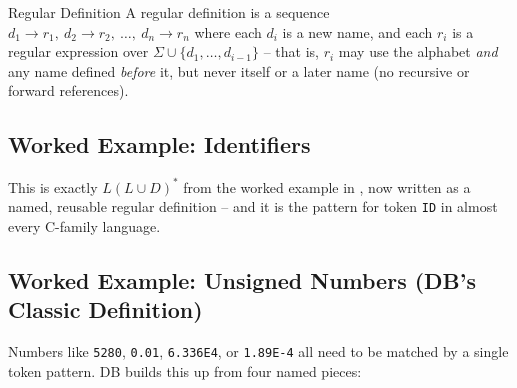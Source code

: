 \documentclass[full-course-notes.tex]{subfiles}
\begin{document}
\begin{defbox}{Regular Definition}
A regular definition is a sequence $d_1 \to r_1,\ d_2 \to r_2,\ \dots,\ d_n \to r_n$ where each
$d_i$ is a new name, and each $r_i$ is a regular expression over $\Sigma \cup \{d_1,\dots,
d_{i-1}\}$ -- that is, $r_i$ may use the alphabet \emph{and} any name defined \emph{before} it,
but never itself or a later name (no recursive or forward references).
\end{defbox}

\subsection{Worked Example: Identifiers}
\label{sec:l4-worked-example-identifiers}

\begin{center}
\end{center}

This is exactly $L(L\cup D)^{*}$ from the worked example in ,
now written as a named, reusable regular definition -- and it is the pattern for token
\texttt{ID} in almost every C-family language.

\subsection{Worked Example: Unsigned Numbers (DB's Classic Definition)}
\label{sec:l4-worked-example-numbers}

Numbers like \texttt{5280}, \texttt{0.01}, \texttt{6.336E4}, or \texttt{1.89E-4} all need to be
matched by a single token pattern. DB builds this up from four named pieces:
\end{document}
